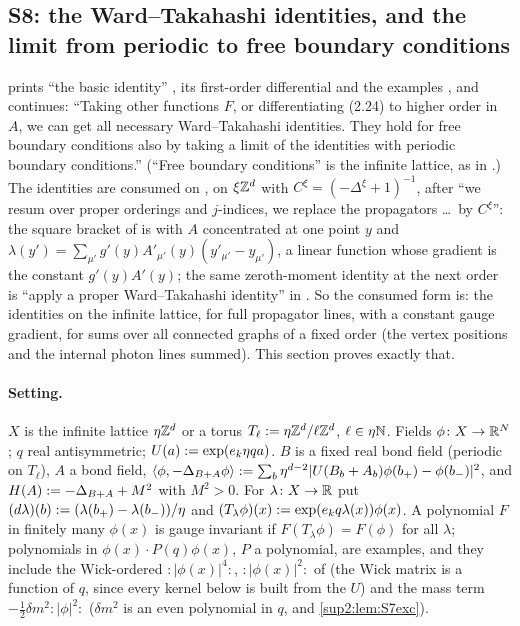 
\subsection{S8: the Ward--Takahashi identities, and the limit from periodic to free boundary conditions}\label{sup2:ssec:S8}

\cite[pp.~430--431]{Ba3} prints ``the basic identity'' \cite[(2.23)]{Ba3}, its first-order differential \cite[(2.24)]{Ba3} and the examples \cite[(2.25)--(2.28)]{Ba3}, and continues: ``Taking other functions $F$, or differentiating (2.24) to higher order in $A$, we can get all necessary Ward--Takahashi identities. They hold for free boundary conditions also by taking a limit of the identities with periodic boundary conditions.'' (``Free boundary conditions'' is the infinite lattice, as in \cite[p.~584]{Ba4}.) The identities are consumed on \cite[pp.~441--442]{Ba3}, on $\xi\mathbb Z^d$ with $C^\xi=(-\Delta^\xi+1)^{-1}$, after ``we resum over proper orderings and $j$-indices, we replace the propagators \dots\ by $C^\xi$'': the square bracket of \cite[(3.29)]{Ba3} is \cite[(2.26)]{Ba3} with $A$ concentrated at one point $y$ and $\lambda(y')=\sum_{\mu'}g'(y)A'_{\mu'}(y)(y'_{\mu'}-y_{\mu'})$, a linear function whose gradient is the constant $g'(y)A'(y)$; the same zeroth-moment identity at the next order is ``apply a proper Ward--Takahashi identity'' in \cite[(3.31)--(3.32)]{Ba3}. So the consumed form is: the identities on the infinite lattice, for full propagator lines, with a constant gauge gradient, for sums over all connected graphs of a fixed order (the vertex positions and the internal photon lines summed). This section proves exactly that.

\paragraph{Setting.} $X$ is the infinite lattice $\eta\mathbb Z^d$ or a torus $T_\ell:=\eta\mathbb Z^d/\ell\mathbb Z^d$, $\ell\in\eta\mathbb N$. Fields $\phi\colon X\to\mathbb R^N$; $q$ real antisymmetric; $U(a):=\exp(e_k\eta qa)$. $B$ is a fixed real bond field (periodic on $T_\ell$), $A$ a bond field, $\langle\phi,-\Delta_{B+A}\phi\rangle:=\sum_b\eta^{d-2}|U(B_b+A_b)\phi(b_+)-\phi(b_-)|^2$, and $H(A):=-\Delta_{B+A}+M^2$ with $M^2>0$. For $\lambda\colon X\to\mathbb R$ put $(d\lambda)(b):=(\lambda(b_+)-\lambda(b_-))/\eta$ and $(T_\lambda\phi)(x):=\exp(e_kq\lambda(x))\phi(x)$. A polynomial $F$ in finitely many $\phi(x)$ is gauge invariant if $F(T_\lambda\phi)=F(\phi)$ for all $\lambda$; polynomials in $\phi(x)\cdot P(q)\phi(x)$, $P$ a polynomial, are examples, and they include the Wick-ordered $:\!|\phi(x)|^4\!:$, $:\!|\phi(x)|^2\!:$ of \cite[(2.24)--(2.28)]{Ba3} (the Wick matrix is a function of $q$, since every kernel below is built from the $U$) and the mass term $-\frac12\delta m^2:\!|\phi|^2\!:$ ($\delta m^2$ is an even polynomial in $q$, \cite[(1.23)]{Ba3} and \cref{sup2:lem:S7exc}).


